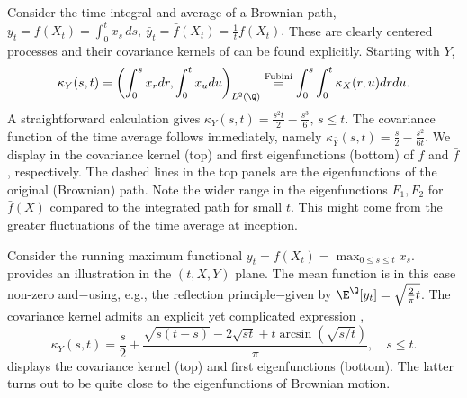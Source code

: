 \begin{example} \label{ex:timeIntAvg}
 Consider  the time integral and average of a Brownian path, 
$y_t = 
f(X_t) = \int_0^t x_s\, ds, \ \bar{y}_{t}= 
\bar{f}(X_t) = \frac{1}{t}f(X_t). $
These are clearly centered processes and their covariance kernels of can be found explicitly. Starting with $Y$, 
$$\kappa_{Y}(s,t) =  \left(\int_0^s x_r dr,\int_0^t x_u du \right)_{L^2(\Q)} \overset{\textnormal{Fubini}}{=} \int_0^s\int_0^t \kappa_X(r,u) dr du.$$
A straightforward calculation gives
$\kappa_{Y}(s,t)  = \frac{s^2 t}{2} - \frac{s^3}{6}, \, s\le t.$
The covariance function of the time average follows immediately, namely
$\kappa_{\bar{Y}}(s,t)   = \frac{s}{2} -\frac{s^2}{6t}.$
We display in   the covariance kernel (top) and first eigenfunctions (bottom) of $f$ and $\bar{f}$, respectively.
The dashed lines in the top panels  are the eigenfunctions of the original (Brownian) path. Note the wider range in the eigenfunctions $F_1,F_2$ for $\bar{f}(X)$ compared to the integrated path for small $t$.  This might come from the greater fluctuations of the time average at inception. 

\end{example}
\begin{example} Consider the running maximum  functional $y_t= 
f(X_t) = \max_{0 \le s \le t} x_s$.   provides an illustration in the $(t,X,Y)$ plane. The mean function is in this case non-zero and$-$using, e.g., the reflection principle$-$given by $\E^{\Q}[y_t] = \sqrt{\frac{2}{\pi} t}$. The covariance kernel admits an explicit yet complicated expression \cite{Benichou}, 
$$\kappa_Y(s,t) = \frac{s}{2} + \frac{\sqrt{s(t-s)}-2\sqrt{st} + t \arcsin(\sqrt{s/t})}{\pi}, \quad s \le t.$$
 displays the covariance kernel (top) and first eigenfunctions (bottom). The latter turns out to be quite close to the eigenfunctions of Brownian motion. 

\end{example}



